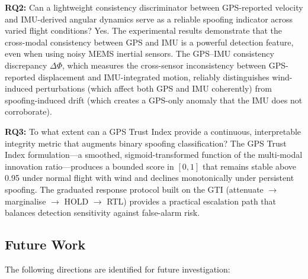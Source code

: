 \documentclass[electronics,article,accept,moreauthors]{Definitions/mdpi}
\begin{document}
\textbf{RQ2:} Can a lightweight consistency discriminator between GPS-reported velocity and IMU-derived angular dynamics serve as a reliable spoofing indicator across varied flight conditions? Yes. The experimental results demonstrate that the cross-modal consistency between GPS and IMU is a powerful detection feature, even when using noisy MEMS inertial sensors. The GPS--IMU consistency discrepancy $\Delta\Phi$, which measures the cross-sensor inconsistency between GPS-reported displacement and IMU-integrated motion, reliably distinguishes wind-induced perturbations (which affect both GPS and IMU coherently) from spoofing-induced drift (which creates a GPS-only anomaly that the IMU does not corroborate).

\textbf{RQ3:} To what extent can a GPS Trust Index provide a continuous, interpretable integrity metric that augments binary spoofing classification? The GPS Trust Index formulation---a smoothed, sigmoid-transformed function of the multi-modal innovation ratio---produces a bounded score in $[0, 1]$ that remains stable above 0.95 under normal flight with wind and declines monotonically under persistent spoofing. The graduated response protocol built on the GTI (attenuate $\rightarrow$ marginalise $\rightarrow$ HOLD $\rightarrow$ RTL) provides a practical escalation path that balances detection sensitivity against false-alarm risk.

\subsection{Future Work}

The following directions are identified for future investigation:
\end{document}
